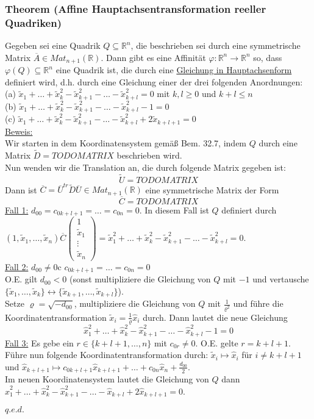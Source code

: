 \documentclass[a4paper]{article}
\newcommand{\ul}{\underline}
\renewcommand{\proof}{\ul{Beweis:}\\}
\renewcommand{\qed}{\begin{flushright}
\ul{\(q.e.d.\)}
\end{flushright}}
\let\phi\varphi
\begin{document}
\subsubsection{Theorem (Affine Hauptachsentransformation reeller Quadriken)}
Gegeben sei eine Quadrik \(Q\subseteq \mathbb{R}^n\), die beschrieben sei durch eine symmetrische Matrix \(\overline{A}\in Mat_{n+1}(\mathbb{R})\). Dann gibt es eine Affinität \(\phi:\mathbb{R}^n\rightarrow\mathbb{R}^n\) so, dass \(\phi(Q)\subseteq\mathbb{R}^n\) eine Quadrik ist, die durch eine \ul{Gleichung in Hauptachsenform} definiert wird, d.h. durch eine Gleichung einer der drei folgenden Anordnungen:\\
(a) \(\tilde{x}_1+\dots+\tilde{x}_k^2-\tilde{x}_{k+1}^2-\dots-\tilde{x}_{k+l}^2=0\) mit \(k,l\geq 0\) und \(k+l\leq n\)\\
(b) \(\tilde{x}_1+\dots+\tilde{x}_k^2-\tilde{x}_{k+1}^2-\dots-\tilde{x}_{k+l}^2-1=0\)\\
(c) \(\tilde{x}_1+\dots+\tilde{x}_k^2-\tilde{x}_{k+1}^2-\dots-\tilde{x}_{k+l}^2+2\tilde{x}_{k+l+1}=0\)\\
\proof
Wir starten in dem Koordinatensystem gemäß Bem. 32.7, indem \(Q\) durch eine Matrix \(\tilde{D}=TODO MATRIX\) beschrieben wird.\\
Nun wenden wir die Translation an, die durch folgende Matrix gegeben ist: $$\tilde{U}=TODO MATRIX$$
Dann ist \(\overline{C}=\overline{U}^{tr}\tilde{D}\overline{U}\in Mat_{n+1}(\mathbb{R})\) eine symmetrische Matrix der Form
$$\overline{C}=TODO MATRIX$$
\ul{Fall 1:} \(d_{00}=c_{0k+l+1}=\dots=c_{0n}=0\). In diesem Fall ist \(Q\) definiert durch \((1,\tilde{x}_1,\dots,\tilde{x}_n)\overline{C}\begin{pmatrix}
1\\
\tilde{x}_1\\
\vdots\\
\tilde{x}_n
\end{pmatrix}=\tilde{x}_1^2+\dots+\tilde{x}_k^2-\tilde{x}_{k+1}^2-\dots-\tilde{x}_{k+l}^2=0\).\\
\ul{Fall 2:} \(d_{00}\neq 0\)c \(c_{0k+l+1}=\dots=c_{0n}=0\)\\
O.E. gilt \(d_{00}<0\) (sonst multipliziere die Gleichung von \(Q\) mit \(-1\) und vertausche \(\{\tilde{x}_1,\dots,\tilde{x}_k\}\leftrightarrow\{\tilde{x}_{k+1},\dots,\tilde{x}_{k+l}\}\)).\\
Setze \(\varrho=\sqrt{-d_{00}}\), multipliziere die Gleichung von \(Q\) mit \(\frac{1}{\varrho^2}\) und führe die Koordinatentransformation \(\tilde{x}_i=\frac{1}{\varrho}\hat{x}_i\) durch. Dann lautet die neue Gleichung
$$\hat{x}_1^2+\dots+\hat{x}_k^2-\hat{x}_{k+1}^2-\dots-\hat{x}_{k+l}^2-1=0$$
\ul{Fall 3:}  Es gebe ein \(r\in\{k+l+1,\dots,n\}\) mit \(c_{0r}\neq 0\). O.E. gelte \(r=k+l+1\).\\
Führe nun folgende Koordinatentransformation durch: \(\tilde{x}_i\mapsto \hat{x}_i\) für \(i\neq k+l+1\) und \(\hat{x}_{k+l+1}\mapsto c_{0k+l+1}\hat{x}_{k+l+1}+\dots+c_{0n}\hat{x}_n+\frac{d_{00}}{2}\).\\
Im neuen Koordinatensystem lautet die Gleichung von \(Q\) dann \(\hat{x}_1^2+\dots+\hat{x}_k^2-\hat{x}_{k+1}^2-\dots-\hat{x}_{k+l}+2\hat{x}_{k+l+1}=0\).
\qed
\end{document}
